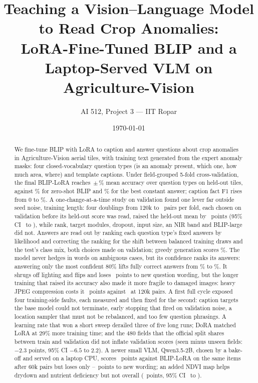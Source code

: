 \documentclass[10pt,twocolumn]{article}
\title{Teaching a Vision--Language Model to Read Crop Anomalies:\\LoRA-Fine-Tuned BLIP and a Laptop-Served VLM on Agriculture-Vision}
\author{AI 512, Project 3 --- IIT Ropar}
\date{\today}
\begin{document}
\maketitle

\begin{abstract}
We fine-tune BLIP with LoRA to caption and answer questions about crop anomalies in Agriculture-Vision aerial tiles, with training text generated from the expert anomaly masks: four closed-vocabulary question types (is an anomaly present, which one, how much area, where) and template captions. Under field-grouped 5-fold cross-validation, the final BLIP-LoRA reaches \blipCorrMean\,$\pm$\,\blipCorrMeanStd\% mean accuracy over question types on held-out tiles, against \zeroMean\% for zero-shot BLIP and \constMean\% for the best constant answer; caption fact F1 rises from 0 to \blipFactF\%. A one-change-at-a-time study on validation found one lever far outside seed noise, training length: four doublings from 120k to \finalPairs\ pairs per fold, each chosen on validation before its held-out score was read, raised the held-out mean by \totalChange\ points (95\% CI \totalChangeLo\ to \totalChangeHi), while rank, target modules, dropout, input size, an NIR band and BLIP-large did not. Answers are read out by ranking each question type's fixed answers by likelihood and correcting the ranking for the shift between balanced training draws and the test's class mix, both choices made on validation; greedy generation scores \blipGreedy\%. The model never hedges in words on ambiguous cases, but its confidence ranks its answers: answering only the most confident 80\% lifts fully correct answers from \blipAccAll\% to \blipAccEighty\%. It shrugs off lighting and flips and loses \blipParaphraseDrop\ points to new question wording, but the longer training that raised its accuracy also made it more fragile to damaged images: heavy JPEG compression costs it \blipJpegDrop\ points against \vtwoJpegDrop\ at 120k pairs. A first full cycle exposed four training-side faults, each measured and then fixed for the second: caption targets the base model could not terminate, early stopping that fired on validation noise, a location sampler that must not be rebalanced, and too few question phrasings. A learning rate that won a short sweep derailed three of five long runs; DoRA matched LoRA at 29\% more training time; and the 480 fields that the official split shares between train and validation did not inflate validation scores (seen minus unseen fields: $-2.3$ points, 95\% CI $-6.5$ to 2.2). A newer small VLM, Qwen3.5-2B, chosen by a bake-off and served on a laptop CPU, scores \qwenNdviDiff\ points against BLIP-LoRA on the same items after 60k pairs but loses only \servedRgbParaphraseDrop--\servedNdviParaphraseDrop\ points to new wording; an added NDVI map helps drydown and nutrient deficiency but not overall (\ndviDiff\ points, 95\% CI \ndviLo\ to \ndviHi).
\end{abstract}
\end{document}
